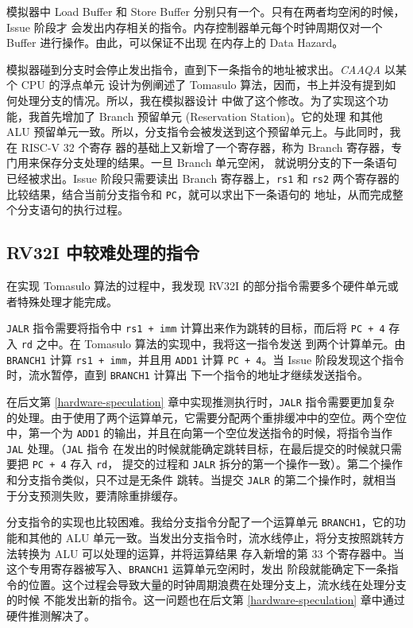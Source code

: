 \documentclass[12pt]{article}
\begin{document}
    模拟器中 Load Buffer 和 Store Buffer 分别只有一个。只有在两者均空闲的时候，Issue 阶段才
    会发出内存相关的指令。内存控制器单元每个时钟周期仅对一个 Buffer 进行操作。由此，可以保证不出现
    在内存上的 Data Hazard。

    模拟器碰到分支时会停止发出指令，直到下一条指令的地址被求出。\emph{CAAQA} 以某个 CPU 的浮点单元
    设计为例阐述了 Tomasulo 算法，因而，书上并没有提到如何处理分支的情况。所以，我在模拟器设计
    中做了这个修改。为了实现这个功能，我首先增加了 Branch 预留单元 (Reservation Station)。它的处理
    和其他 ALU 预留单元一致。所以，分支指令会被发送到这个预留单元上。与此同时，我在 RISC-V 32 个寄存
    器的基础上又新增了一个寄存器，称为 Branch 寄存器，专门用来保存分支处理的结果。一旦 Branch 单元空闲，
    就说明分支的下一条语句已经被求出。Issue 阶段只需要读出 Branch 寄存器上，\texttt{rs1} 和
    \texttt{rs2} 两个寄存器的比较结果，结合当前分支指令和 \texttt{PC}，就可以求出下一条语句的
    地址，从而完成整个分支语句的执行过程。

    \subsection{RV32I 中较难处理的指令}

    在实现 Tomasulo 算法的过程中，我发现 RV32I 的部分指令需要多个硬件单元或者特殊处理才能完成。

    \texttt{JALR} 指令需要将指令中 \texttt{rs1 + imm} 计算出来作为跳转的目标，而后将
    \texttt{PC + 4} 存入 \texttt{rd} 之中。在 Tomasulo 算法的实现中，我将这一指令发送
    到两个计算单元。由 \texttt{BRANCH1} 计算 \texttt{rs1 + imm}，并且用 \texttt{ADD1}
    计算 \texttt{PC + 4}。当 Issue 阶段发现这个指令时，流水暂停，直到 \texttt{BRANCH1} 计算出
    下一个指令的地址才继续发送指令。

    在后文第 \ref{hardware-speculation} 章中实现推测执行时，\texttt{JALR} 指令需要更加复杂
    的处理。由于使用了两个运算单元，它需要分配两个重排缓冲中的空位。两个空位中，第一个为 \texttt{ADD1}
    的输出，并且在向第一个空位发送指令的时候，将指令当作 \texttt{JAL} 处理。（\texttt{JAL} 指令
    在发出的时候就能确定跳转目标，在最后提交的时候就只需要把 \texttt{PC + 4} 存入 \texttt{rd}，
    提交的过程和 \texttt{JALR} 拆分的第一个操作一致）。第二个操作和分支指令类似，只不过是无条件
    跳转。当提交 \texttt{JALR} 的第二个操作时，就相当于分支预测失败，要清除重排缓存。
    
    分支指令的实现也比较困难。我给分支指令分配了一个运算单元 \texttt{BRANCH1}，它的功能和其他的 ALU
    单元一致。当发出分支指令时，流水线停止，将分支按照跳转方法转换为 ALU 可以处理的运算，并将运算结果
    存入新增的第 33 个寄存器中。当这个专用寄存器被写入、\texttt{BRANCH1} 运算单元空闲时，发出
    阶段就能确定下一条指令的位置。这个过程会导致大量的时钟周期浪费在处理分支上，流水线在处理分支的时候
    不能发出新的指令。这一问题也在后文第 \ref{hardware-speculation} 章中通过硬件推测解决了。
\end{document}
